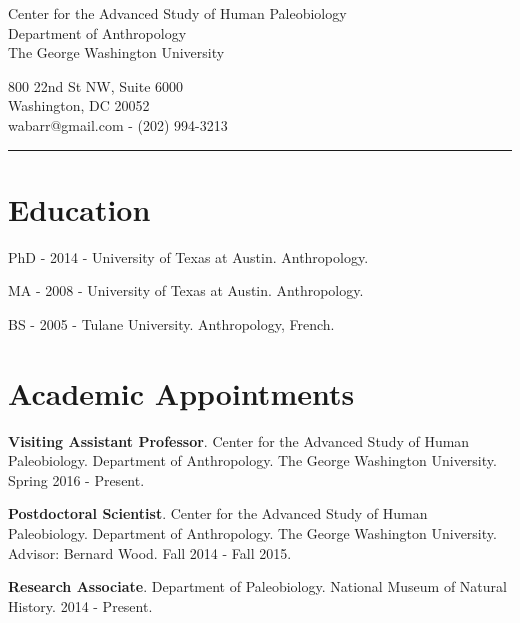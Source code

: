 \documentclass{article}
\begin{document}
\begin{center}
\end{center}

\vspace{15pt}

\noindent\begin{minipage}{.60\textwidth}
\begin{flushleft}
Center for the Advanced Study of Human Paleobiology\\
Department of Anthropology\\
The George Washington University\\
\end{flushleft}
\end{minipage}
\begin{minipage}{.395\textwidth}
\begin{flushright}
800 22nd St NW, Suite 6000\\
Washington, DC 20052 \\
wabarr@gmail.com - (202) 994-3213\\
\end{flushright}
\end{minipage}


\noindent\rule[-2mm]{\textwidth}{1pt}

\section*{Education}
\begin{description*}
\item[] PhD - 2014 - University of Texas at Austin. Anthropology.
\item[] MA  - 2008 - University of Texas at Austin. Anthropology.
\item[] BS  - 2005 - Tulane University. Anthropology, French.
\end{description*}


\section*{Academic Appointments}
\begin{description*}
\item[] {\bfseries Visiting Assistant Professor}. Center for the Advanced Study of Human Paleobiology. Department of Anthropology. The George Washington University. Spring 2016 - Present.
\item[] {\bfseries Postdoctoral Scientist}. Center for the Advanced Study of Human Paleobiology. Department of Anthropology. The George Washington University. Advisor: Bernard Wood. Fall 2014 - Fall 2015.
\item[] {\bfseries Research Associate}. Department of Paleobiology.  National Museum of Natural History. 2014 - Present.
\end{description*}
\end{document}

